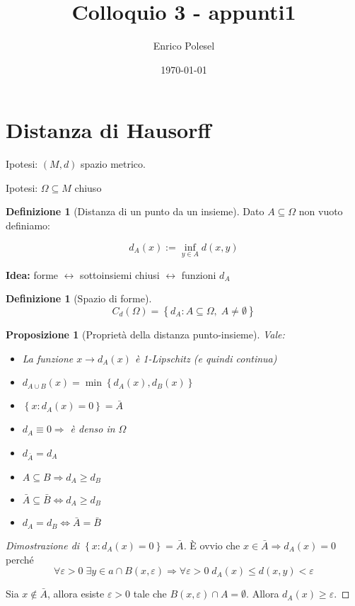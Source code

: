 \documentclass[a4paper,10pt]{article}
\title{Colloquio 3 - appunti1}
\author{Enrico Polesel}
\date{\today}
\newcounter{counter1}
\theoremstyle{plain}
\newtheorem{mypro}[counter1]{Proposizione}
\theoremstyle{definition}
\newtheorem{mydef}[counter1]{Definizione}
\theoremstyle{remark}
\newcommand{\set}[1]{\left\{#1\right\}}
\begin{document}
\maketitle

\section{Distanza di Hausorff}

Ipotesi: $(M,d)$ spazio metrico.

Ipotesi: $\Omega \subseteq M$ chiuso

\begin{mydef}[Distanza di un punto da un insieme]
Dato $A \subseteq \Omega$ non vuoto definiamo:

\[  d_A (x) := \inf _{y \in A} d(x,y) \] 
\end{mydef}

\textbf{Idea:} forme $\leftrightarrow$ sottoinsiemi chiusi
$\leftrightarrow$ funzioni $d_A$

\begin{mydef}[Spazio di forme]
  \[ C_d(\Omega) = \set{d_A : A \subseteq \Omega,\; A \neq \emptyset} \]
\end{mydef}

\begin{mypro}[Proprietà della distanza punto-insieme]
  Vale:
  \begin{itemize}
  \item La funzione $x \rightarrow d_A(x)$ è 1-Lipschitz (e quindi
    continua)
  \item $d_{A\cup B}(x) = \min\set{d_A(x),d_B(x)}$
  \item $\set{x:d_A(x) = 0} = \bar A$
  \item $d_A \equiv 0 \Rightarrow $ è denso in $\Omega$
  \item $d_{\bar A} = d_A$
  \item $A\subseteq B \Rightarrow d_A \ge d_B$
  \item $\bar A \subseteq \bar B \Leftrightarrow d_A \ge d_B$
  \item $d_A = d_B \Leftrightarrow \bar A = \bar B$
  \end{itemize}
\end{mypro}
\begin{proof} [Dimostrazione di $\set{x:d_A(x) = 0} = \bar A$]
  \`E ovvio che $x\in \bar A \Rightarrow d_A(x) = 0$ perché 
  \[ \forall \varepsilon > 0\; \exists y \in a \cap B(x,\varepsilon)
  \Rightarrow \forall \varepsilon > 0 \; d_A(x) \le d(x,y) <
  \varepsilon \]

  Sia $x\not\in \bar A$, allora esiste $\varepsilon>0$ tale che
  $B(x,\varepsilon) \cap A = \emptyset$. Allora $d_A(x) \ge
  \varepsilon$.
\end{proof}
\end{document}
